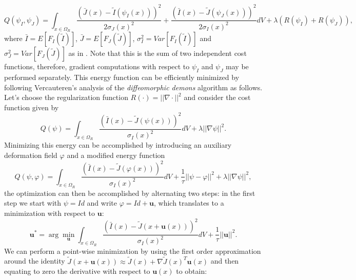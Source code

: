 \begin{equation}\label{eq:SyNEM_energy}
    Q(\psi_{I}, \psi_{J}) = \int_{x \in \Omega_{R}} \frac{(\bar{J}(x) - \tilde{I}(\psi_{I}(x)))^{2}}{2\sigma_{J}(x)^{2}} +
                                                     \frac{(\bar{I}(x) - \tilde{J}(\psi_{J}(x)))^{2}}{2\sigma_{I}(x)^{2}} dV +
                                                     \lambda\left(R(\psi_{I}) + R(\psi_{J})\right),
\end{equation}
where $\bar{I} = E[F_{I}(\tilde{I})]$, $\bar{J} = E[F_{J}(\tilde{J})]$, $\sigma_{I}^{2} =Var[F_{I}(\tilde{I})]$ and $\sigma_{J}^{2} =Var[F_{J}(\tilde{J})]$ as in
\cite{Arce-santana2014}. Note that this is the sum of two independent cost functions, therefore, gradient computations with respect to $\psi_{I}$ and $\psi_{J}$ may be
performed separately. This energy function can be efficiently minimized by following Vercauteren's analysis of the \textit{diffeomorphic demons} algorithm \cite{Vercauteren2009}
as follows. Let's choose the regularization function $R(\cdot) = ||\nabla \cdot||^{2}$ and consider the cost function given by
\begin{equation}\label{eq:vercauteren_cost}
    Q(\psi) = \int_{x \in \Omega_{R}} \frac{(\bar{I}(x) - \tilde{J}(\psi(x)))^{2}}{\sigma_{I}(x)^{2}} dV + \lambda ||\nabla \psi||^{2}.
\end{equation}
Minimizing this energy can be accomplished by introducing an auxiliary deformation field $\varphi$ and a modified energy function
\begin{equation}\label{eq:vercauteren_extended_cost}
    Q(\psi, \varphi) = \int_{x \in \Omega_{R}} \frac{(\bar{I}(x) - \tilde{J}(\varphi(x)))^{2}}{\sigma_{I}(x)^{2}} dV + \frac{1}{\tau}||\psi-\varphi||^{2}+\lambda ||\nabla \psi||^{2},
\end{equation}
the optimization can then be accomplished by alternating two steps: in the first step we start with $\psi = Id$ and write $\varphi = Id + \mathbf{u}$, which translates to a
minimization with respect to $\mathbf{u}$:
\begin{equation}\label{eq:vercauteren_step1}
    \mathbf{u}^{*} = \arg\min_{\mathbf{u}}\int_{x \in \Omega_{R}} \frac{(\bar{I}(x) - \tilde{J}(x+\mathbf{u}(x)))^{2}}{\sigma_{I}(x)^{2}} dV + \frac{1}{\tau} ||\mathbf{u}||^{2}.
\end{equation}
We can perform a point-wise minimization by using the first order approximation around the identity
$\tilde{J}(x+\mathbf{u}(x)) \approx \tilde{J}(x) + \nabla \tilde{J}(x)^{T}\mathbf{u}(x)$ and then equating to zero the derivative with respect to $\mathbf{u}(x)$ to obtain:
